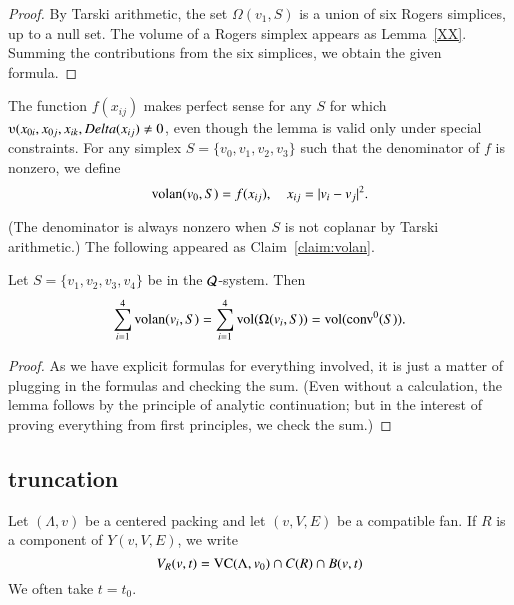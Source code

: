 \begin{proof} By Tarski arithmetic, the set $\Omega(v_1,S)$ is a union of
six Rogers simplices, up to a null set.  The volume of a Rogers simplex appears
as Lemma~\ref{XX}.  Summing the contributions from the six simplices, we obtain
the given formula.
\end{proof}

\begin{definition}[volan]\label{def:volan}
The function $f(x_{ij})$ makes perfect sense for any $S$ for which $\ups(x_{0i},x_{0j},x_{ik},\Delta(x_{ij})\ne 0$,
even though the lemma is valid only under special constraints.
For any simplex $S=\{v_0,v_1,v_2,v_3\}$ such that the denominator of $f$ is nonzero, we define
$$
{\operatorname{volan}}(v_0,S) = f(x_{ij}),\quad x_{ij} = |v_i-v_j|^2.
$$  
\end{definition}

(The denominator is always nonzero when $S$ is not coplanar by Tarski arithmetic.)
The following appeared as Claim~\ref{claim:volan}.


\begin{lemma}  %
Let $S=\{v_1,v_2,v_3,v_4\}$ be in the ${\mathcal Q}$-system. Then
    $$
    \sum_{i=1}^4 {\operatorname{volan}}(v_i,S) = \sum_{i=1}^4
    {\operatorname{vol}}(\Omega(v_i,S)) = {\operatorname{vol}}({\operatorname{conv}}^0(S)).
    $$
\end{lemma}

\begin{proof} As we have explicit formulas for everything involved,
it is just a matter of plugging in the formulas and checking the sum.
(Even without a calculation, the lemma follows by the principle of analytic continuation;
but in the interest of proving everything from first principles, we
check the sum.)
\end{proof}

\subsection{truncation}

Let $(\Lambda,v)$ be a centered packing and let $(v,V,E)$ be a compatible
fan.
If $R$ is a component of $Y(v,V,E)$, we write 
  $$
  V_R(v,t) = {\operatorname{VC}}(\Lambda,v_0)\cap C(R)\cap B(v,t)
  $$
We often
take $t=t_0$.



